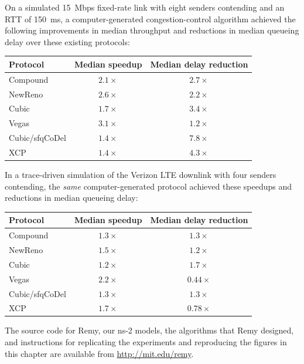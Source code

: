 On a simulated 15~Mbps fixed-rate link with eight senders contending and
an RTT of 150~ms, a computer-generated congestion-control algorithm
achieved the following improvements in median throughput and
reductions in median queueing delay over these existing protocols:

\label{sec:remyresults}

\begin{center}

\begin{tabular}{|l|c|c|}
\hline
Protocol & Median speedup & Median delay reduction \\
\hline
\hline
Compound & $2.1\times$ & $2.7\times$ \\
NewReno & $2.6\times$ & $2.2\times$ \\
Cubic & $1.7\times$ & $3.4\times$ \\
Vegas & $3.1\times$ & $1.2\times$ \\
\hline
Cubic/sfqCoDel & $1.4\times$ & $7.8\times$ \\
XCP & $1.4\times$ & $4.3\times$ \\
\hline
\end{tabular}

\end{center}

In a trace-driven simulation of the Verizon LTE downlink with four
senders contending, the \emph{same} computer-generated protocol achieved these
speedups and reductions in median queueing delay:

\begin{center}
\begin{tabular}{|l|c|c|}
\hline
Protocol & Median speedup & Median delay reduction \\
\hline
\hline
Compound & $1.3\times$ & $1.3\times$ \\
NewReno & $1.5\times$ & $1.2\times$ \\
Cubic & $1.2\times$ & $1.7\times$ \\
Vegas & $2.2\times$ & \cellcolor{red!20}$0.44\times$ \\
\hline
Cubic/sfqCoDel & $1.3\times$ & $1.3\times$ \\
XCP & $1.7\times$ & \cellcolor{red!20}$0.78\times$ \\
\hline
\end{tabular}

\end{center}

The source code for Remy, our ns-2 models, the algorithms that Remy
designed, and instructions for replicating the experiments and
reproducing the figures in this chapter are available from
\mbox{\url{http://mit.edu/remy}}.
